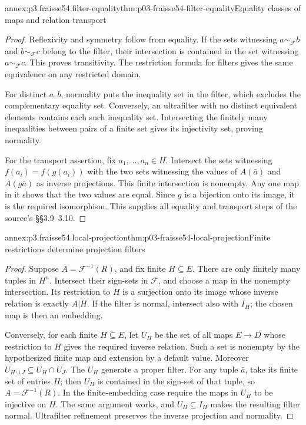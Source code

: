\begin{annexitem}{annex:p3.fraisse54.filter-equality}{thm:p03-fraisse54-filter-equality}{Equality classes of maps and relation transport}
\begin{proof}
Reflexivity and symmetry follow from equality. If the sets witnessing
\(a\sim_{\mathcal F}b\) and \(b\sim_{\mathcal F}c\) belong to the
filter, their intersection is contained in the set witnessing
\(a\sim_{\mathcal F}c\). This proves transitivity. The restriction formula
for filters gives the same equivalence on any restricted domain.

For distinct \(a,b\), normality puts the inequality set in the filter,
which excludes the complementary equality set. Conversely, an ultrafilter
with no distinct equivalent elements contains each such inequality set.
Intersecting the finitely many inequalities between pairs of a finite set
gives its injectivity set, proving normality.

For the transport assertion, fix \(a_1,\ldots,a_n\in H\). Intersect the
sets witnessing \(f(a_i)=f(g(a_i))\) with the two sets witnessing the
values of \(A(\bar a)\) and \(A(g\bar a)\) as inverse projections.
This finite intersection is nonempty. Any one map in it shows that the two
values are equal. Since \(g\) is a bijection onto its image, it is the
required isomorphism. This supplies all equality and transport steps of
the source's \S\S3.9--3.10.
\end{proof}
\end{annexitem}

\begin{annexitem}{annex:p3.fraisse54.local-projection}{thm:p03-fraisse54-local-projection}{Finite restrictions determine projection filters}
\begin{proof}
Suppose \(A=\mathcal F^{-1}(R)\), and fix finite \(H\subseteq E\).
There are only finitely many tuples in \(H^n\). Intersect their sign-sets
in \(\mathcal F\), and choose a map in the nonempty intersection. Its
restriction to \(H\) is a surjection onto its image whose inverse relation
is exactly \(A|H\). If the filter is normal, intersect also with \(I_H\);
the chosen map is then an embedding.

Conversely, for each finite \(H\subseteq E\), let \(U_H\) be the set of
all maps \(E\to D\) whose restriction to \(H\) gives the required
inverse relation. Such a set is nonempty by the hypothesized finite map and
extension by a default value. Moreover
\(U_{H\cup J}\subseteq U_H\cap U_J\). The \(U_H\) generate a proper
filter. For any tuple \(\bar a\), take its finite set of entries \(H\);
then \(U_H\) is contained in the sign-set of that tuple, so
\(A=\mathcal F^{-1}(R)\). In the finite-embedding case require the maps
in \(U_H\) to be injective on \(H\). The same argument works, and
\(U_H\subseteq I_H\) makes the resulting filter normal. Ultrafilter
refinement preserves the inverse projection and normality.
\end{proof}
\end{annexitem}


